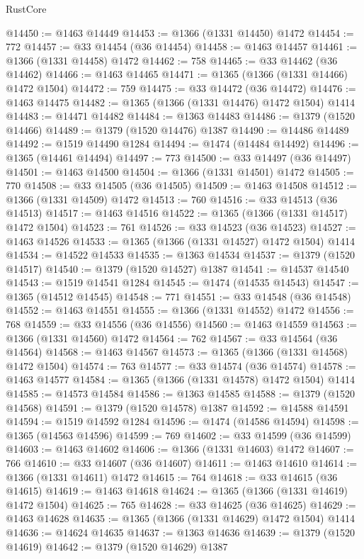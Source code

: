 \begin{lexlean}{RustCore}
\begin{coremodule}
@14450 := @1463 @14449
@14453 := @1366 (@1331 @14450) @1472
@14454 := 772
@14457 := @33 @14454 (@36 @14454)
@14458 := @1463 @14457
@14461 := @1366 (@1331 @14458) @1472
@14462 := 758
@14465 := @33 @14462 (@36 @14462)
@14466 := @1463 @14465
@14471 := @1365 (@1366 (@1331 @14466) @1472 @1504)
@14472 := 759
@14475 := @33 @14472 (@36 @14472)
@14476 := @1463 @14475
@14482 := @1365 (@1366 (@1331 @14476) @1472 @1504) @1414
@14483 := @14471 @14482
@14484 := @1363 @14483
@14486 := @1379 (@1520 @14466)
@14489 := @1379 (@1520 @14476) @1387
@14490 := @14486 @14489
@14492 := @1519 @14490 @1284
@14494 := @1474 (@14484 @14492)
@14496 := @1365 (@14461 @14494)
@14497 := 773
@14500 := @33 @14497 (@36 @14497)
@14501 := @1463 @14500
@14504 := @1366 (@1331 @14501) @1472
@14505 := 770
@14508 := @33 @14505 (@36 @14505)
@14509 := @1463 @14508
@14512 := @1366 (@1331 @14509) @1472
@14513 := 760
@14516 := @33 @14513 (@36 @14513)
@14517 := @1463 @14516
@14522 := @1365 (@1366 (@1331 @14517) @1472 @1504)
@14523 := 761
@14526 := @33 @14523 (@36 @14523)
@14527 := @1463 @14526
@14533 := @1365 (@1366 (@1331 @14527) @1472 @1504) @1414
@14534 := @14522 @14533
@14535 := @1363 @14534
@14537 := @1379 (@1520 @14517)
@14540 := @1379 (@1520 @14527) @1387
@14541 := @14537 @14540
@14543 := @1519 @14541 @1284
@14545 := @1474 (@14535 @14543)
@14547 := @1365 (@14512 @14545)
@14548 := 771
@14551 := @33 @14548 (@36 @14548)
@14552 := @1463 @14551
@14555 := @1366 (@1331 @14552) @1472
@14556 := 768
@14559 := @33 @14556 (@36 @14556)
@14560 := @1463 @14559
@14563 := @1366 (@1331 @14560) @1472
@14564 := 762
@14567 := @33 @14564 (@36 @14564)
@14568 := @1463 @14567
@14573 := @1365 (@1366 (@1331 @14568) @1472 @1504)
@14574 := 763
@14577 := @33 @14574 (@36 @14574)
@14578 := @1463 @14577
@14584 := @1365 (@1366 (@1331 @14578) @1472 @1504) @1414
@14585 := @14573 @14584
@14586 := @1363 @14585
@14588 := @1379 (@1520 @14568)
@14591 := @1379 (@1520 @14578) @1387
@14592 := @14588 @14591
@14594 := @1519 @14592 @1284
@14596 := @1474 (@14586 @14594)
@14598 := @1365 (@14563 @14596)
@14599 := 769
@14602 := @33 @14599 (@36 @14599)
@14603 := @1463 @14602
@14606 := @1366 (@1331 @14603) @1472
@14607 := 766
@14610 := @33 @14607 (@36 @14607)
@14611 := @1463 @14610
@14614 := @1366 (@1331 @14611) @1472
@14615 := 764
@14618 := @33 @14615 (@36 @14615)
@14619 := @1463 @14618
@14624 := @1365 (@1366 (@1331 @14619) @1472 @1504)
@14625 := 765
@14628 := @33 @14625 (@36 @14625)
@14629 := @1463 @14628
@14635 := @1365 (@1366 (@1331 @14629) @1472 @1504) @1414
@14636 := @14624 @14635
@14637 := @1363 @14636
@14639 := @1379 (@1520 @14619)
@14642 := @1379 (@1520 @14629) @1387

\end{coremodule}
\end{lexlean}
